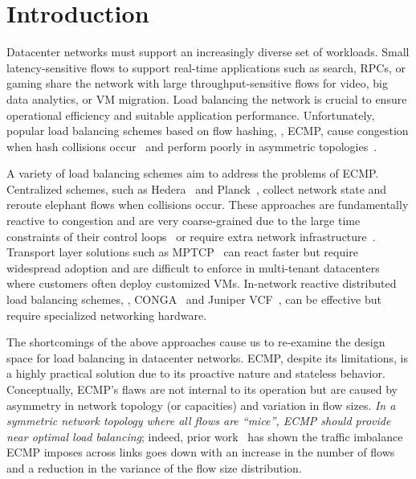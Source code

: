 \section{Introduction}
\label{section:intro}

Datacenter networks must support an increasingly diverse set of
workloads.
Small latency-sensitive flows to support real-time applications such
as search, RPCs, or gaming share the network with large
throughput-sensitive flows for video, big data analytics, or VM
migration.
Load balancing the network is crucial to ensure operational efficiency
and suitable application performance.
Unfortunately, popular load balancing schemes based on flow hashing,
\eg{}, ECMP, cause congestion when hash collisions
occur~\cite{hedera,dc-mptcp,planck,vmware,detail,packetspray,drb} and
perform poorly in asymmetric topologies~\cite{conga,wcmp}.

A variety of load balancing schemes aim to address the
problems of ECMP.
Centralized schemes, such as Hedera~\cite{hedera} and
Planck~\cite{planck}, collect network state and reroute elephant flows
when collisions occur.
These approaches are fundamentally reactive to congestion and are
very coarse-grained due to the large time constraints of their control
loops~\cite{hedera} or require extra network
infrastructure~\cite{planck}.
Transport layer solutions such as MPTCP~\cite{mptcp} can
react faster but require widespread adoption and are difficult to
enforce in multi-tenant datacenters where customers often deploy
customized VMs.
In-network reactive distributed load balancing schemes, \eg{},
CONGA~\cite{conga} and Juniper VCF~\cite{juniper-vcf}, can be
effective but require specialized networking hardware.


The shortcomings of the above approaches cause us to re-examine the design space for load balancing in datacenter networks. ECMP, despite its limitations, is a highly practical solution due to its proactive nature and stateless behavior.
Conceptually, ECMP's flaws are not internal to its operation but are caused by asymmetry in network topology (or capacities) and variation in flow sizes. {\em In a symmetric network topology
where all flows are ``mice'', ECMP should provide near optimal load balancing}; indeed, prior work~\cite{conga,flowlet} has shown the traffic imbalance ECMP imposes across links goes down with an increase in the number of flows and a reduction in the variance of the flow size distribution. 

